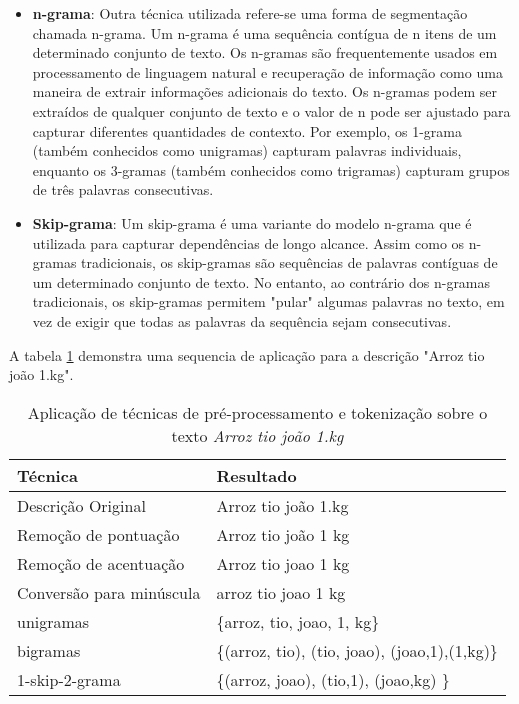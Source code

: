 \begin{itemize}
   \item \textbf{n-grama}: Outra técnica utilizada refere-se uma forma de segmentação chamada n-grama.  Um n-grama é uma sequência contígua de n itens de um determinado conjunto de texto. Os n-gramas são frequentemente usados em processamento de linguagem natural e recuperação de informação como uma maneira de extrair informações adicionais do texto.
Os n-gramas podem ser extraídos de qualquer conjunto de texto e o valor de n pode ser ajustado para capturar diferentes quantidades de contexto. Por exemplo, os 1-grama (também conhecidos como unigramas) capturam palavras individuais, enquanto os 3-gramas (também conhecidos como trigramas) capturam grupos de três palavras consecutivas.
    \item \textbf{Skip-grama}: Um skip-grama é uma variante do modelo n-grama que é utilizada para capturar dependências de longo alcance. Assim como os n-gramas tradicionais, os skip-gramas são sequências de palavras contíguas de um determinado conjunto de texto. No entanto, ao contrário dos n-gramas tradicionais, os skip-gramas permitem "pular" algumas palavras no texto, em vez de exigir que todas as palavras da sequência sejam consecutivas.
\end{itemize}

A tabela \ref{tab:exemplopreprocessamento} demonstra uma sequencia de aplicação para a descrição  "Arroz tio joão 1.kg".

\begin{table}[!htp]
\centering

\begin{tabular}{l|l}
\hline
Técnica                                       & Resultado                                      \\ 
\hline
Descrição Original       & Arroz tio joão 1.kg                            \\
Remoção de pontuação     & Arroz tio joão 1 kg                            \\
Remoção de acentuação    & Arroz tio joao 1 kg                            \\
Conversão para minúscula & arroz tio joao 1 kg                            \\
unigramas                & \{arroz, tio, joao, 1, kg\}                    \\
bigramas                 & \{(arroz, tio), (tio, joao), (joao,1),(1,kg)\} \\ 
1-skip-2-grama          & \{(arroz, joao), (tio,1), (joao,kg) \} \\
\hline
\end{tabular}
\caption{Aplicação de técnicas de pré-processamento e tokenização sobre o texto \textit{Arroz tio joão 1.kg}}
\label{tab:exemplopreprocessamento}
\end{table}

